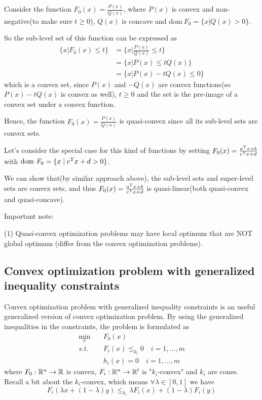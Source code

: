 \begin{example}
	Consider the function $F_0(x) = \frac{P(x)}{Q(x)}$, where $P(x)$ is convex and non-negative(to make sure $t\geq 0$), $Q(x)$ is concave and $\text{dom}\ F_0 = \{x\vert Q(x) >0 \}$.
	
	So the sub-level set of this function can be expressed as
	\begin{align*}
	\{x\vert F_0(x) \leq t \} &= \{x\vert \frac{P(x)}{Q(x)}\leq t \}\\
	&= \{x\vert P(x)\leq tQ(x) \}\\
	&= \{x\vert P(x) - tQ(x)\leq 0 \}
	\end{align*}
	which is a convex set, since $P(x)$ and $-Q(x)$ are convex functions(so $P(x)-tQ(x)$ is convex as well), $t\geq 0$ and the set is the pre-image of a convex set under a convex function.
	
	Hence, the function $F_0(x) = \frac{P(x)}{Q(x)}$ is quasi-convex since all its sub-level sets are convex sets.
	
	Let's consider the special case for this kind of functions by setting $F_0(x)= \frac{a^{{\rm T}} x+b}{c^{{\rm T}} x +d}$ with $\text{dom}\ F_0=\{x\mid c^{{\rm T}} x+d >0 \}$.
	
	We can show that(by similar approach above), the sub-level sets and super-level sets are convex sets, and thus $F_0(x)= \frac{a^{{\rm T}} x+b}{c^{{\rm T}} x +d}$ is quasi-linear(both quasi-convex and quasi-concave).

\end{example}

 Important note:
 
 (1) Quasi-convex optimization problems may have local optimum that are NOT global optimum (differ from the convex optimization problems).



\vspace{0.5cm}
\subsection{Convex optimization problem with generalized inequality constraints}
Convex optimization problem with generalized inequality constraints is an useful generalized version of convex optimization problem. By using the generalized inequalities in the constraints, the problem is formulated as
\begin{align*}
\min_x\quad & F_0(x) \\
s.t.\quad & F_i(x) \leq_{k_i} 0 \quad i = 1,...,m\\
& h_i(x) = 0\quad i = 1,...,m 
\end{align*}
where $F_0:\mathbb{R}^n\to \mathbb{R}$ is convex, $F_i: \mathbb{R}^n\to \mathbb{R}^l$ is "$k_i$-convex" and $k_i$ are cones. Recall a bit about the $k_i$-convex, which means $\forall \lambda\in [0, 1]$ we have
$$F_i(\lambda x + (1-\lambda)y)\leq_{k_i} \lambda F_i(x) + (1-\lambda)F_i(y)$$


